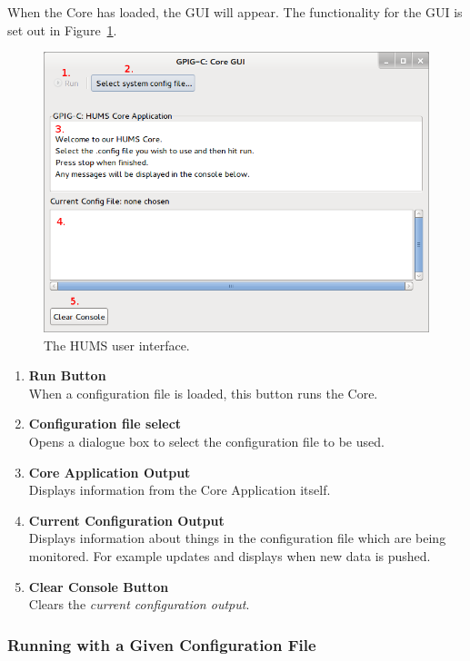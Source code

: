\documentclass[10pt,a4paper]{article}
\begin{document}
When the Core has loaded, the GUI will appear. The functionality for the GUI is set out in Figure~\ref{fig:manualgui}.
\begin{figure}[H]
  \centering
  \includegraphics[width=\textwidth]{images/manual-gui.png}
  \caption{The HUMS user interface.}
  \label{fig:manualgui}
\end{figure}
  \begin{enumerate}
\item \textbf{Run Button} \\ 
When a configuration file is loaded, this button runs the Core.
\item \textbf{Configuration file select} \\ 
Opens a dialogue box to select the configuration file to be used.
\item \textbf{Core Application Output} \\ 
Displays information from the Core Application itself.
\item \textbf{Current Configuration Output} \\ 
Displays information about things in the configuration file which are being monitored. For example updates and displays when new data is pushed.
\item \textbf{Clear Console Button} \\ 
Clears the \emph{current configuration output}.
\end{enumerate}

\subsubsection{Running with a Given Configuration File}
\label{subsec:loadconf}
\end{document}
